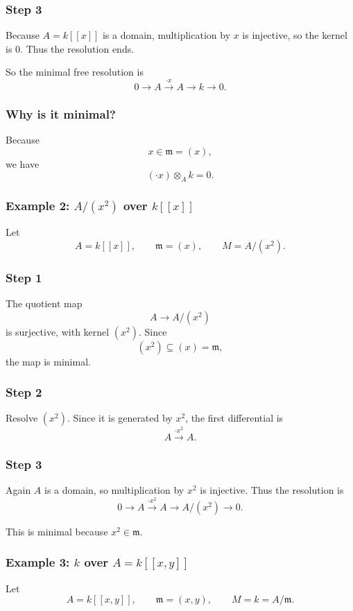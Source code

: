 \documentclass[12pt,a4paper]{article}
\theoremstyle{notespace}
\newcommand{\m}{\mathfrak m}
\begin{document}
\subsubsection*{Step 3}
Because \(A=k[[x]]\) is a domain, multiplication by \(x\) is injective, so the kernel is \(0\). Thus the resolution ends.

So the minimal free resolution is
\[
0\longrightarrow A \xrightarrow{\cdot x} A \longrightarrow k \longrightarrow 0.
\]

\subsubsection*{Why is it minimal?}
Because
\[
x\in \m=(x),
\]
we have
\[
(\cdot x)\otimes_A k = 0.
\]

\subsubsection{Example 2: \(A/(x^2)\) over \(k[[x]]\)}

Let
\[
A=k[[x]],\qquad \m=(x),\qquad M=A/(x^2).
\]

\subsubsection*{Step 1}
The quotient map
\[
A\to A/(x^2)
\]
is surjective, with kernel \((x^2)\). Since
\[
(x^2)\subseteq (x)=\m,
\]
the map is minimal.

\subsubsection*{Step 2}
Resolve \((x^2)\). Since it is generated by \(x^2\), the first differential is
\[
A\xrightarrow{\cdot x^2}A.
\]

\subsubsection*{Step 3}
Again \(A\) is a domain, so multiplication by \(x^2\) is injective. Thus the resolution is
\[
0\longrightarrow A \xrightarrow{\cdot x^2} A \longrightarrow A/(x^2)\longrightarrow 0.
\]

This is minimal because \(x^2\in \m\).

\subsubsection{Example 3: \(k\) over \(A=k[[x,y]]\)}

Let
\[
A=k[[x,y]],\qquad \m=(x,y),\qquad M=k=A/\m.
\]
\end{document}
